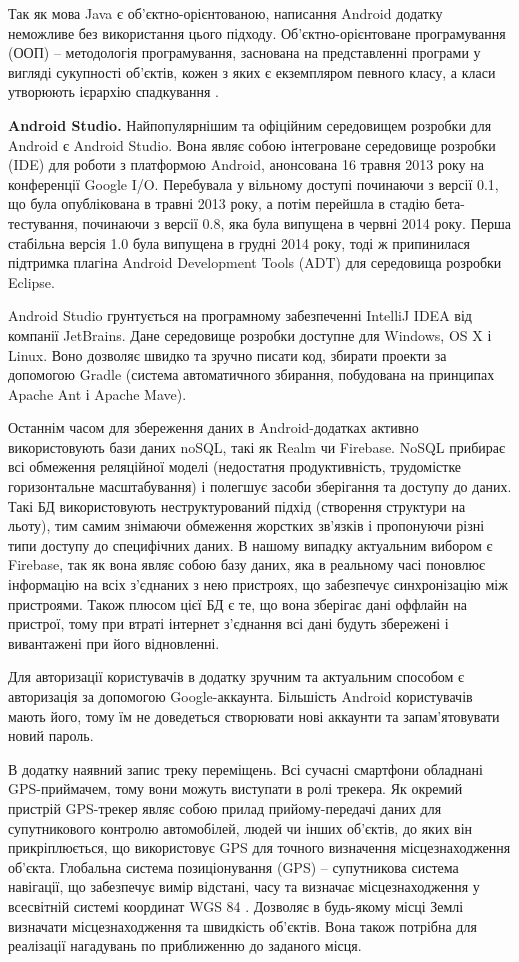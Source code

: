 \documentclass[../main.tex]{subfiles}
\begin{document}
Так як мова Java є об'єктно-орієнтованою, написання Android додатку неможливе без використання цього підходу. Об'єктно-орієнтоване програмування (ООП) -- методологія програмування, заснована на представленні програми у вигляді сукупності об'єктів, кожен з яких є екземпляром певного класу, а класи утворюють ієрархію спадкування \cite{oop}.

\textbf{Android Studio.}
Найпопулярнішим та офіційним середовищем розробки для Android є Android Studio. Вона являє собою інтегроване середовище розробки (IDE) для роботи з платформою Android, анонсована 16 травня 2013 року на конференції Google I/O. Перебувала у вільному доступі починаючи з версії 0.1, що була опублікована в травні 2013 року, а потім перейшла в стадію бета-тестування, починаючи з версії 0.8, яка була випущена в червні 2014 року. Перша стабільна версія 1.0 була випущена в грудні 2014 року, тоді ж припинилася підтримка плагіна Android Development Tools (ADT) для середовища розробки Eclipse.

Android Studio грунтується на програмному забезпеченні IntelliJ IDEA від компанії JetBrains. Дане середовище розробки доступне для Windows, OS X і Linux. Воно дозволяє швидко та зручно писати код, збирати проекти за допомогою Gradle (система автоматичного збирання, побудована на принципах Apache Ant і Apache Mave).

Останнім часом для збереження даних в Android-додатках активно використовують бази даних noSQL, такі як Realm чи Firebase. NoSQL прибирає всі обмеження реляційної моделі (недостатня продуктивність, трудомістке горизонтальне масштабування) і полегшує засоби зберігання та доступу до даних. Такі БД використовують неструктурований підхід (створення структури на льоту), тим самим знімаючи обмеження жорстких зв'язків і пропонуючи різні типи доступу до специфічних даних. В нашому випадку актуальним вибором є Firebase, так як вона являє собою базу даних, яка в реальному часі поновлює інформацію на всіх з'єднаних з нею пристроях, що забезпечує синхронізацію між пристроями. Також плюсом цієї БД є те, що вона зберігає дані оффлайн на пристрої, тому при втраті інтернет з'єднання всі дані будуть збережені і вивантажені при його відновленні.

Для авторизації користувачів в додатку зручним та актуальним способом є авторизація за допомогою Google-аккаунта. Більшість Android користувачів мають його, тому їм не доведеться створювати нові аккаунти та запам'ятовувати новий пароль.

В додатку наявний запис треку переміщень. Всі сучасні смартфони обладнані GPS-приймачем, тому вони можуть виступати в ролі трекера.  Як окремий пристрій GPS-трекер являє собою прилад прийому-передачі даних для супутникового контролю автомобілей, людей чи інших об'єктів, до яких він прикріплюється, що використовує GPS для точного визначення місцезнаходження об'єкта. Глобальна система позиціонування (GPS) – супутникова система навігації, що забезпечує вимір відстані, часу та визначає місцезнаходження у всесвітній системі координат WGS 84 \cite{gps}. Дозволяє в будь-якому місці Землі визначати місцезнаходження та швидкість об'єктів. Вона також потрібна для реалізації нагадувань по приближенню до заданого місця.
\end{document}

